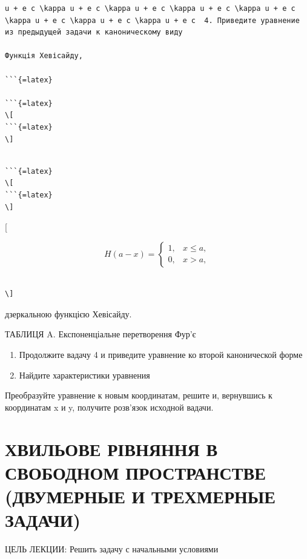 \documentclass[
  ukrainian,
]{article}
\begin{document}
\begin{verbatim}
u + e c \kappa u + e c \kappa u + e c \kappa u + e c \kappa u + e c \kappa u + e c \kappa u + e c \kappa u + e c  4. Приведите уравнение из предыдущей задачи к каноническому виду

Функція Хевісайду,

```{=latex}

```{=latex}
\[
```{=latex}
\]
\end{verbatim}

\begin{verbatim}

```{=latex}
\[
```{=latex}
\]
\end{verbatim}

{[}

\[
H(a-x) = \begin{cases} 1, & x \leqslant a, \\ 0, & x > a, \end{cases}
\]

\begin{verbatim}

\]
\end{verbatim}

дзеркальною функцією Хевісайду.

ТАБЛИЦЯ A. Експоненціальне перетворення Фур'є

\begin{enumerate}
\def\labelenumi{\arabic{enumi}.}
\setcounter{enumi}{4}
\item
  Продолжите вадачу 4 и приведите уравнение ко второй канонической форме
\item
  Найдите характеристики уравнения
\end{enumerate}

Преобразуйте уравнение к новым координатам, решите и, вернувшись к
координатам x и y, получите розв'язок исходной вадачи.

\section{ХВИЛЬОВЕ РІВНЯННЯ В СВОБОДНОМ ПРОСТРАНСТВЕ (ДВУМЕРНЫЕ И
ТРЕХМЕРНЫЕ
ЗАДАЧИ)}\label{ux445ux432ux438ux43bux44cux43eux432ux435-ux440ux456ux432ux43dux44fux43dux43dux44f-ux432-ux441ux432ux43eux431ux43eux434ux43dux43eux43c-ux43fux440ux43eux441ux442ux440ux430ux43dux441ux442ux432ux435-ux434ux432ux443ux43cux435ux440ux43dux44bux435-ux438-ux442ux440ux435ux445ux43cux435ux440ux43dux44bux435-ux437ux430ux434ux430ux447ux438}

ЦЕЛЬ ЛЕКЦИИ: Решить задачу с начальными условиями
\end{document}
